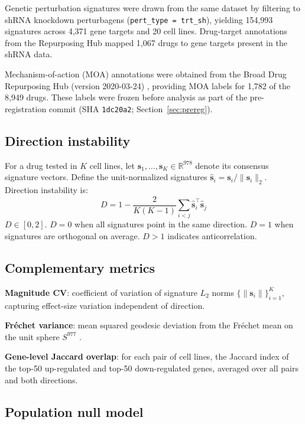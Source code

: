 \documentclass{article}
\begin{document}
Genetic perturbation signatures were drawn from the same dataset by
filtering to shRNA knockdown perturbagens (\texttt{pert\_type = trt\_sh}),
yielding 154{,}993 signatures across 4{,}371 gene targets and 20 cell lines.
Drug-target annotations from the Repurposing Hub mapped 1{,}067 drugs to
gene targets present in the shRNA data.

Mechanism-of-action (MOA) annotations were obtained from the Broad Drug
Repurposing Hub (version 2020-03-24) \citep{corsello2017drug}, providing
MOA labels for 1{,}782 of the 8{,}949 drugs. These labels were frozen
before analysis as part of the pre-registration commit
(SHA \texttt{1dc20a2}; Section~\ref{sec:prereg}).

\subsection{Direction instability}

For a drug tested in $K$ cell lines, let $\mathbf{s}_1, \ldots,
\mathbf{s}_K \in \mathbb{R}^{978}$ denote its consensus signature vectors.
Define the unit-normalized signatures $\hat{\mathbf{s}}_i =
\mathbf{s}_i / \|\mathbf{s}_i\|_2$. Direction instability is:
\begin{equation}
  D = 1 - \frac{2}{K(K-1)} \sum_{i < j}
    \hat{\mathbf{s}}_i^\top \hat{\mathbf{s}}_j
  \label{eq:direction_instability}
\end{equation}
$D \in [0, 2]$. $D = 0$ when all signatures point in the same direction.
$D = 1$ when signatures are orthogonal on average. $D > 1$ indicates
anticorrelation.

\subsection{Complementary metrics}

\textbf{Magnitude CV}: coefficient of variation of signature $L_2$ norms
$\{\|\mathbf{s}_i\|\}_{i=1}^K$, capturing effect-size variation independent
of direction.

\textbf{Fr\'echet variance}: mean squared geodesic deviation from the
Fr\'echet mean on the unit sphere $S^{977}$
\citep{pennec2006intrinsic}.

\textbf{Gene-level Jaccard overlap}: for each pair of cell lines, the
Jaccard index of the top-50 up-regulated and top-50 down-regulated genes,
averaged over all pairs and both directions.

\subsection{Population null model}
\end{document}

